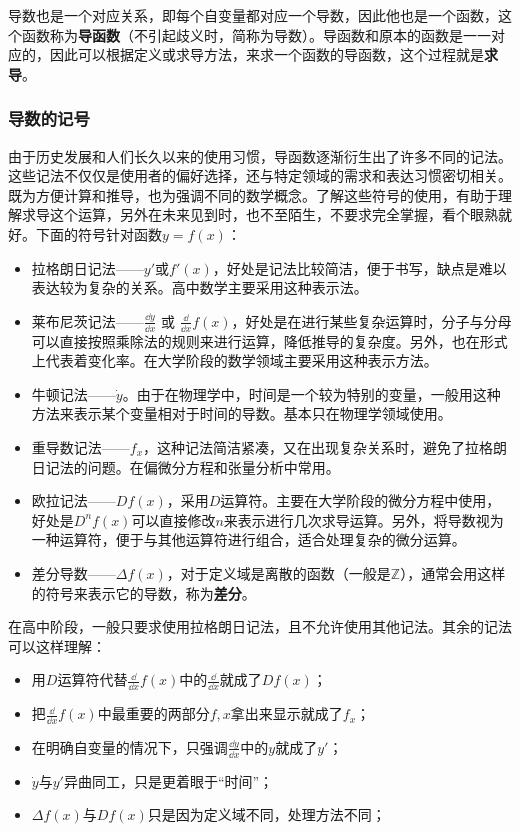 导数也是一个对应关系，即每个自变量都对应一个导数，因此他也是一个函数，这个函数称为\textbf{导函数}（不引起歧义时，简称为导数）。导函数和原本的函数是一一对应的，因此可以根据定义或求导方法，来求一个函数的导函数，这个过程就是\textbf{求导}。

\subsubsection{导数的记号}
由于历史发展和人们长久以来的使用习惯，导函数逐渐衍生出了许多不同的记法。这些记法不仅仅是使用者的偏好选择，还与特定领域的需求和表达习惯密切相关。既为方便计算和推导，也为强调不同的数学概念。了解这些符号的使用，有助于理解求导这个运算，另外在未来见到时，也不至陌生，不要求完全掌握，看个眼熟就好。下面的符号针对函数$y=f(x)$：
\begin{itemize}
\item 拉格朗日记法——$y'$或$f'(x)$，好处是记法比较简洁，便于书写，缺点是难以表达较为复杂的关系。高中数学主要采用这种表示法。
\item 莱布尼茨记法——$\displaystyle\frac{\dd y}{\dd x}$  或  $\displaystyle\frac{\dd}{\dd x}f(x)$，好处是在进行某些复杂运算时，分子与分母可以直接按照乘除法的规则来进行运算，降低推导的复杂度。另外，也在形式上代表着变化率。在大学阶段的数学领域主要采用这种表示方法。
\item 牛顿记法——$\dot{y}$。由于在物理学中，时间是一个较为特别的变量，一般用这种方法来表示某个变量相对于时间的导数。基本只在物理学领域使用。
\item 重导数记法——$f_x$，这种记法简洁紧凑，又在出现复杂关系时，避免了拉格朗日记法的问题。在偏微分方程和张量分析中常用。
\item 欧拉记法——$Df(x)$，采用$D$运算符。主要在大学阶段的微分方程中使用，好处是$D^n f(x)$可以直接修改$n$来表示进行几次求导运算。另外，将导数视为一种运算符，便于与其他运算符进行组合，适合处理复杂的微分运算。
\item 差分导数——$\Delta f(x)$，对于定义域是离散的函数（一般是$\mathbb{Z}$），通常会用这样的符号来表示它的导数，称为\textbf{差分}。
\end{itemize}

在高中阶段，一般只要求使用拉格朗日记法，且不允许使用其他记法。其余的记法可以这样理解：
\begin{itemize}
\item 用$D$运算符代替$\displaystyle\frac{\dd}{\dd x}f(x)$中的$\displaystyle\frac{\dd}{\dd x}$就成了$Df(x)$；
\item 把$\displaystyle\frac{\dd}{\dd x}f(x)$中最重要的两部分$f,x$拿出来显示就成了$f_x$；
\item 在明确自变量的情况下，只强调$\displaystyle\frac{\dd y}{\dd x}$中的$y$就成了$y'$；
\item $\dot{y}$与$y'$异曲同工，只是更着眼于“时间”；
\item $\Delta f(x)$与$Df(x)$只是因为定义域不同，处理方法不同；
\end{itemize}

